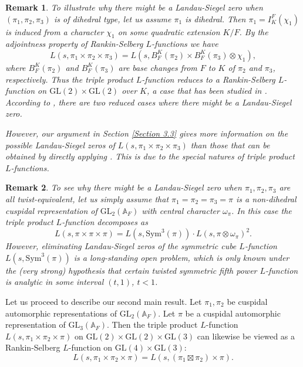 \documentclass[12pt]{amsart}
\newcommand{\bA}{\mathbb{A}}
\newcommand{\Sym}{\text{Sym}}
\newcommand{\GL}{\text{GL}}
\newtheorem{remark}{Remark}[section]
\begin{document}
\begin{remark}
    To illustrate why there might be a Landau-Siegel zero when $(\pi_1,\pi_2,\pi_3)$ is of dihedral type, let us assume $\pi_1$ is dihedral. Then $\pi_1 = I_K^F(\chi_1)$ is induced from a character $\chi_1$ on some quadratic extension $K/F$. By the adjointness property of Rankin-Selberg $L$-functions we have 
    \begin{equation*}
        L(s,\pi_1 \times \pi_2 \times \pi_3) = L(s,B_F^K(\pi_2) \times B_F^K(\pi_3) \otimes \chi_1),
    \end{equation*}
    where $B_F^K(\pi_2)$ and $B_F^K(\pi_3)$ are base changes from $F$ to $K$ of $\pi_2$ and $\pi_3$, respectively. Thus the triple product $L$-function reduces to a Rankin-Selberg $L$-function on $\GL(2) \times \GL(2)$ over $K$, a case that has been studied in \cite{RamakrishnanWang2003}. According to \cite[Theorem A]{RamakrishnanWang2003}, there are two reduced cases where there might be a Landau-Siegel zero.

    However, our argument in Section \ref{Section 3.3} gives more information on the possible Landau-Siegel zeros of $L(s,\pi_1 \times \pi_2 \times \pi_3)$ than those that can be obtained by directly applying \cite[Theorem A]{RamakrishnanWang2003}. This is due to the special natures of triple product $L$-functions.
\end{remark}

\begin{remark}
    To see why there might be a Landau-Siegel zero when $\pi_1,\pi_2,\pi_3$ are all twist-equivalent, let us simply assume that $\pi_1 = \pi_2 = \pi_3 = \pi$ is a non-dihedral cuspidal representation of $\GL_2(\bA_F)$ with central character $\omega_\pi$. In this case the triple product $L$-function decomposes as 
    \begin{equation*}
        L(s,\pi \times \pi \times \pi) = L(s,\Sym^3(\pi)) \cdot L(s,\pi \otimes \omega_\pi)^2.
    \end{equation*}
    However, eliminating Landau-Siegel zeros of the symmetric cube $L$-function $L(s,\Sym^3(\pi))$ is a long-standing open problem, which is only known under the (very strong) hypothesis that certain twisted symmetric fifth power $L$-function is analytic in some interval $(t,1)$, $t<1$.
\end{remark}

Let us proceed to describe our second main result. Let $\pi_1,\pi_2$ be cuspidal automorphic representations of $\GL_2(\bA_F)$. Let $\pi$ be a cuspidal automorphic representation of $\GL_3(\bA_F)$. Then the triple product $L$-function $L(s,\pi_1 \times \pi_2 \times \pi)$ on $\GL(2) \times \GL(2) \times \GL(3)$ can likewise be viewed as a Rankin-Selberg $L$-function on $\GL(4) \times \GL(3)$:
\begin{equation*}
    L(s,\pi_1 \times \pi_2 \times \pi) = L(s,(\pi_1 \boxtimes \pi_2) \times \pi).
\end{equation*}
\end{document}
